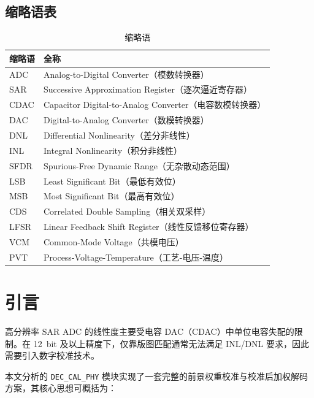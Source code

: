 \documentclass[
  UTF8,
  a4paper,
  11pt,
  oneside,
  fontset=fandol
]{ctexrep}
\newcommand{\code}[1]{\texttt{#1}}
\begin{document}
\section*{缩略语表}

\begin{table}[H]
\centering
\caption{缩略语}
\label{tab:acronyms}
\small
\begin{tabularx}{\textwidth}{l X}
\toprule
缩略语 & 全称 \\
\midrule
ADC & Analog-to-Digital Converter（模数转换器） \\
SAR & Successive Approximation Register（逐次逼近寄存器） \\
CDAC & Capacitor Digital-to-Analog Converter（电容数模转换器） \\
DAC & Digital-to-Analog Converter（数模转换器） \\
DNL & Differential Nonlinearity（差分非线性） \\
INL & Integral Nonlinearity（积分非线性） \\
SFDR & Spurious-Free Dynamic Range（无杂散动态范围） \\
LSB & Least Significant Bit（最低有效位） \\
MSB & Most Significant Bit（最高有效位） \\
CDS & Correlated Double Sampling（相关双采样） \\
LFSR & Linear Feedback Shift Register（线性反馈移位寄存器） \\
VCM & Common-Mode Voltage（共模电压） \\
PVT & Process-Voltage-Temperature（工艺-电压-温度） \\
\bottomrule
\end{tabularx}
\end{table}

\newpage

\chapter{引言}

高分辨率 SAR ADC 的线性度主要受电容 DAC（CDAC）中单位电容失配的限制。在 \SI{12}{bit} 及以上精度下，仅靠版图匹配通常无法满足 INL/DNL 要求，因此需要引入数字校准技术。

本文分析的 \code{DEC\_CAL\_PHY} 模块实现了一套完整的前景权重校准与校准后加权解码方案，其核心思想可概括为：
\end{document}
